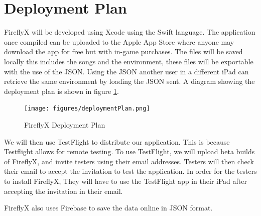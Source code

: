 

\section{Deployment Plan}
FireflyX will be developed using Xcode using the Swift language. The application once compiled can be uploaded to the Apple App Store where anyone may download the app for free but with in-game purchases. The files will be saved locally this includes the songs and the environment, these files will be exportable with the use of the JSON. Using the JSON another user in a different iPad can retrieve the same environment by loading the JSON sent. A diagram showing the deployment plan is shown in figure \ref{deploymentPlan}.

\begin{figure}[H]
    \centering
    \texttt{[image: figures/deploymentPlan.png]}
    \caption{FireflyX Deployment Plan}
    \label{deploymentPlan}
\end{figure}

We will then use TestFlight to distribute our application. This is because Testflight allows for remote testing. To use TestFlight, we will upload beta builds of FireflyX, and invite testers using their email addresses. Testers will then check their email to accept the invitation to test the application. In order for the testers to install FireflyX, They will have to use the TestFlight app in their iPad after accepting the invitation in their email.


FireflyX also uses Firebase to save the data online in JSON format. 